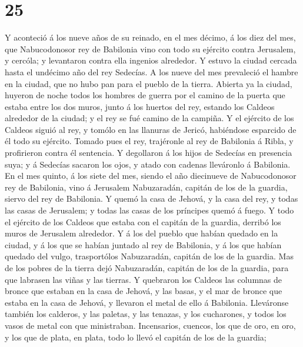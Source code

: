 \hypertarget{section-24}{%
\section{25}\label{section-24}}

 Y aconteció á los nueve años de su reinado, en el mes
décimo, á los diez del mes, que Nabucodonosor rey de Babilonia vino con
todo su ejército contra Jerusalem, y cercóla; y levantaron contra ella
ingenios alrededor.  Y estuvo la ciudad cercada hasta el
undécimo año del rey Sedecías.  A los nueve del mes
prevaleció el hambre en la ciudad, que no hubo pan para el pueblo de la
tierra.  Abierta ya la ciudad, huyeron de noche todos los
hombres de guerra por el camino de la puerta que estaba entre los dos
muros, junto á los huertos del rey, estando los Caldeos alrededor de la
ciudad; y el rey se fué camino de la campiña.  Y el ejército
de los Caldeos siguió al rey, y tomólo en las llanuras de Jericó,
habiéndose esparcido de él todo su ejército.  Tomado pues el
rey, trajéronle al rey de Babilonia á Ribla, y profirieron contra él
sentencia.  Y degollaron á los hijos de Sedecías en
presencia suya; y á Sedecías sacaron los ojos, y atado con cadenas
lleváronlo á Babilonia.  En el mes quinto, á los siete del
mes, siendo el año diecinueve de Nabucodonosor rey de Babilonia, vino á
Jerusalem Nabuzaradán, capitán de los de la guardia, siervo del rey de
Babilonia.  Y quemó la casa de Jehová, y la casa del rey, y
todas las casas de Jerusalem; y todas las casas de los príncipes quemó á
fuego.  Y todo el ejército de los Caldeos que estaba con el
capitán de la guardia, derribó los muros de Jerusalem alrededor.
 Y á los del pueblo que habían quedado en la ciudad, y á
los que se habían juntado al rey de Babilonia, y á los que habían
quedado del vulgo, trasportólos Nabuzaradán, capitán de los de la
guardia.  Mas de los pobres de la tierra dejó Nabuzaradán,
capitán de los de la guardia, para que labrasen las viñas y las tierras.
 Y quebraron los Caldeos las columnas de bronce que estaban
en la casa de Jehová, y las basas, y el mar de bronce que estaba en la
casa de Jehová, y llevaron el metal de ello á Babilonia. 
Lleváronse también los calderos, y las paletas, y las tenazas, y los
cucharones, y todos los vasos de metal con que ministraban.
 Incensarios, cuencos, los que de oro, en oro, y los que de
plata, en plata, todo lo llevó el capitán de los de la guardia;

